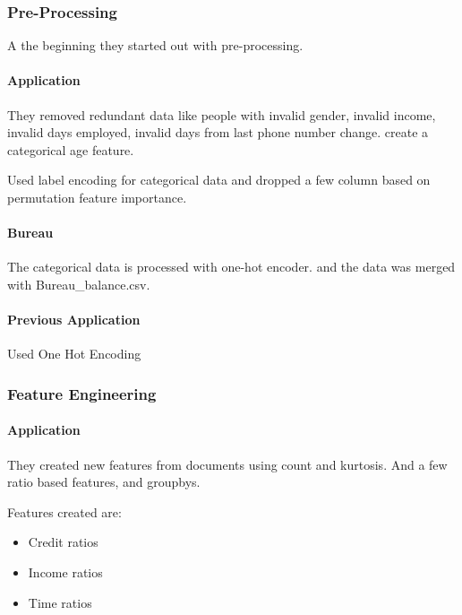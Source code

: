 \documentclass[twoside,a4paper]{article}
\begin{document}
\subsubsection{Pre-Processing}
A the beginning they started out with pre-processing. 

\paragraph{Application}
They removed redundant data like people with invalid gender, invalid income, invalid days employed, invalid days from last phone number change. create a categorical age feature.

Used label encoding for categorical data and dropped a few column based on permutation feature importance.

\paragraph{Bureau}
The categorical data is processed with one-hot encoder. and the data was merged with Bureau\_balance.csv.

\paragraph{Previous Application}
Used One Hot Encoding

\subsubsection{Feature Engineering}

\paragraph{Application}
They created new features from documents using count and kurtosis\cite{kurtosis:1988}. And a few ratio based features, and groupbys.

Features created are:
\begin{itemize}
    \item Credit ratios
    \item Income ratios
    \item Time ratios
\end{itemize}
\end{document}
